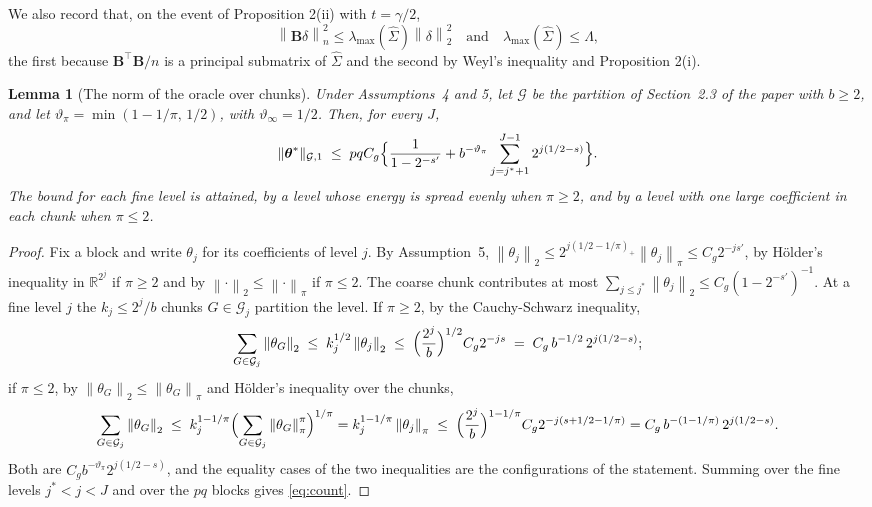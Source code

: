 \documentclass[10pt]{book}
\newtheorem{lemma}{Lemma}[section]
\theoremstyle{definition}
\newcommand{\R}{\mathbb{R}}
\newcommand{\T}{^{\top}}
\newcommand{\norm}[1]{\left\lVert #1 \right\rVert}
\newcommand{\normn}[1]{\left\lVert #1 \right\rVert_{n}}
\newcommand{\lev}{j}
\newcommand{\btheta}{\boldsymbol{\theta}}
\newcommand{\thetastar}{\btheta^{*}}
\newcommand{\Gramhat}{\widehat{\Sigma}}
\newcommand{\seff}{s'}
\newcommand{\Bmat}{\mathbf{B}}
\newcommand{\lmaxx}{\lambda_{\max}}
\newcommand{\Gcal}{\mathcal{G}}
\newcommand{\jst}{j^{*}}
\newcommand{\nGone}[1]{\lVert #1\rVert_{\mathcal{G},1}}
\begin{document}
We also record that, on the event of Proposition 2(ii) with $t = \gamma/2$,
\begin{equation}
  \label{eq:lmax}
  \normn{\Bmat\delta}^2 \le \lmaxx(\Gramhat)\norm{\delta}_2^2
  \quad\text{and}\quad \lmaxx(\Gramhat) \le \Lambda,
\end{equation}
the first because $\Bmat\T\Bmat/n$ is a principal submatrix of $\Gramhat$ and
the second by Weyl's inequality and Proposition 2(i).

{\color{colR1}
\begin{lemma}[The norm of the oracle over chunks]
\label{lem:count}
Under Assumptions~4 and 5, let $\Gcal$ be the partition of Section~2.3 of the
paper with $b \ge 2$, and let $\vartheta_{\pi} = \min(1-1/\pi,\,1/2)$, with
$\vartheta_{\infty} = 1/2$. Then, for every $J$,
\begin{equation}
  \label{eq:count}
  \nGone{\thetastar} \;\le\; pqC_g\Bigl\{\frac{1}{1-2^{-\seff}}
  + b^{-\vartheta_{\pi}}\sum_{\lev=\jst+1}^{J-1}2^{\lev(1/2-s)}\Bigr\}.
\end{equation}
The bound for each fine level is attained, by a level whose energy is spread
evenly when $\pi \ge 2$, and by a level with one large coefficient in each
chunk when $\pi \le 2$.
\end{lemma}

\begin{proof}
Fix a block and write $\theta_{\lev}$ for its coefficients of level $\lev$.
By Assumption~5, $\norm{\theta_{\lev}}_{2} \le
2^{\lev(1/2-1/\pi)_{+}}\norm{\theta_{\lev}}_{\pi} \le C_g2^{-\lev\seff}$, by
Hölder's inequality in $\R^{2^{\lev}}$ if $\pi \ge 2$ and by
$\norm{\cdot}_{2} \le \norm{\cdot}_{\pi}$ if $\pi \le 2$. The coarse chunk
contributes at most $\sum_{\lev\le\jst}\norm{\theta_{\lev}}_{2} \le
C_g(1-2^{-\seff})^{-1}$. At a fine level $\lev$ the $k_{\lev} \le 2^{\lev}/b$
chunks $G \in \Gcal_{\lev}$ partition the level. If $\pi \ge 2$, by the
Cauchy-Schwarz inequality,
\[
  \sum_{G\in\Gcal_{\lev}}\norm{\theta_{G}}_{2}
  \;\le\; k_{\lev}^{1/2}\norm{\theta_{\lev}}_{2}
  \;\le\; \Bigl(\frac{2^{\lev}}{b}\Bigr)^{1/2}C_g2^{-\lev s}
  \;=\; C_g\,b^{-1/2}\,2^{\lev(1/2-s)} ;
\]
if $\pi \le 2$, by $\norm{\theta_{G}}_{2} \le \norm{\theta_{G}}_{\pi}$ and
Hölder's inequality over the chunks,
\[
  \sum_{G\in\Gcal_{\lev}}\norm{\theta_{G}}_{2}
  \;\le\; k_{\lev}^{1-1/\pi}\Bigl(\sum_{G\in\Gcal_{\lev}}
  \norm{\theta_{G}}_{\pi}^{\pi}\Bigr)^{1/\pi}
  = k_{\lev}^{1-1/\pi}\norm{\theta_{\lev}}_{\pi}
  \;\le\; \Bigl(\frac{2^{\lev}}{b}\Bigr)^{1-1/\pi}C_g2^{-\lev(s+1/2-1/\pi)}
  = C_g\,b^{-(1-1/\pi)}\,2^{\lev(1/2-s)} .
\]
Both are $C_gb^{-\vartheta_{\pi}}2^{\lev(1/2-s)}$, and the equality cases of
the two inequalities are the configurations of the statement. Summing over the
fine levels $\jst < \lev < J$ and over the $pq$ blocks gives \eqref{eq:count}.
\end{proof}

}
\end{document}
